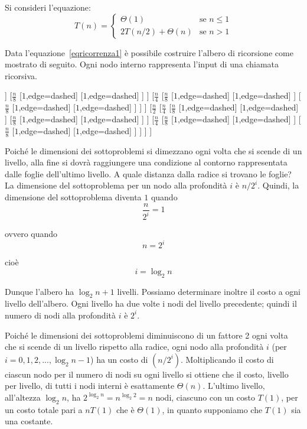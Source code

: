 \begin{example}
	Si consideri l'equazione:
\begin{equation}\label{eqricorrenza1}
	T(n)=
	\begin{cases}
		\Theta(1) & \text{se } n \leq 1 \\
		2T(n/2)+ \Theta(n) & \text{se } n >1
	\end{cases}
\end{equation}
\end{example}

Data l'equazione~\ref{eqricorrenza1} è possibile costruire l'albero di ricorsione come mostrato di seguito. Ogni nodo interno rappresenta l'input di una chiamata ricorsiva.
\begin{center}
\begin{forest}
[$n$
	[$\frac{n}{2}$
		[$\frac{n}{4}$
			[$\frac{n}{8}$
				[$1$,edge=dashed]
				[$1$,edge=dashed]
			]
			[$\frac{n}{8}$
			[$1$,edge=dashed]
			[$1$,edge=dashed]
			]
		]
		[$\frac{n}{4}$
		[$\frac{n}{8}$
		[$1$,edge=dashed]
		[$1$,edge=dashed]
		]
		[$\frac{n}{8}$
		[$1$,edge=dashed]
		[$1$,edge=dashed]
		]
		]
	]
	[$\frac{n}{2}$
	[$\frac{n}{4}$
	[$\frac{n}{8}$
	[$1$,edge=dashed]
	[$1$,edge=dashed]
	]
	[$\frac{n}{8}$
	[$1$,edge=dashed]
	[$1$,edge=dashed]
	]
	]
	[$\frac{n}{4}$
	[$\frac{n}{8}$
	[$1$,edge=dashed]
	[$1$,edge=dashed]
	]
	[$\frac{n}{8}$
	[$1$,edge=dashed]
	[$1$,edge=dashed]
	]
	]
	]
]
\end{forest}
\end{center}

Poiché le dimensioni dei sottoproblemi si dimezzano ogni volta che si scende di un livello, alla fine si dovrà raggiungere una condizione al contorno rappresentata dalle foglie dell'ultimo livello. A quale distanza dalla radice si trovano le foglie? La dimensione del sottoproblema per un nodo alla profondità $i$ è $n/2^{i}$. Quindi, la dimensione del sottoproblema diventa $1$ quando \[ \frac{n}{2^{i}}=1\]

ovvero quando \[n=2^{i}\]

cioè \[i=\log_{2}n\]

Dunque l'albero ha $\log_{2}n+1$ livelli. Possiamo determinare inoltre il costo a ogni livello dell'albero. Ogni livello ha due volte i nodi del livello precedente; quindi il numero di nodi alla profondità $i$ è $2^{i}$.

Poiché le dimensioni dei sottoproblemi diminuiscono di un fattore 2 ogni volta che si scende di un livello rispetto alla radice, ogni nodo alla profondità $i$ (per $i= 0, 1, 2, ..., \log_{2}n-1$) ha un costo di $(n/2^{i})$. Moltiplicando il costo di ciascun nodo per il numero di nodi su ogni livello si ottiene che il costo, livello per livello, di tutti i nodi interni è esattamente $\Theta(n)$. L'ultimo livello, all'altezza $\log_{2}n$, ha $2^{\log_{2}n}=n^{\log_{2}2}=n$ nodi, ciascuno con un costo $T(1)$, per un costo totale pari a $nT(1)$ che è $\Theta(1)$, in quanto supponiamo che $T(1)$ sia una costante.

